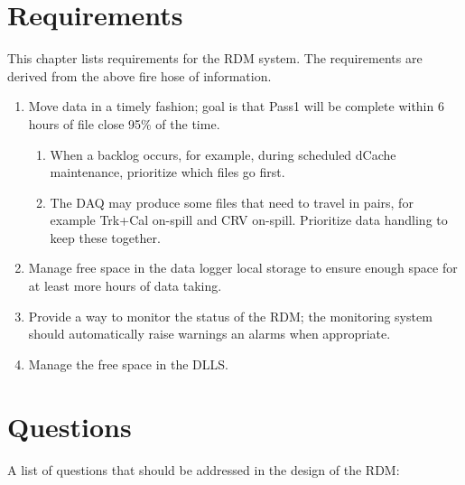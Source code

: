 
\chapter{Requirements}

This chapter lists requirements for the RDM system.
The requirements are derived from the above fire hose of information.

\begin{enumerate}
  \item Move data in a timely fashion; goal is that Pass1 will be complete within 6 hours of file close 95\% of the time.
  \begin{enumerate}
    \item When a backlog occurs, for example, during scheduled dCache maintenance, prioritize which files go first.
    \item The DAQ may produce some files that need to travel in pairs, for example Trk+Cal on-spill and CRV on-spill.
          Prioritize data handling to keep these together.
  \end{enumerate}
\item Manage free space in the data logger local storage to ensure enough space for at least  more
  hours of data taking.
\item Provide a way to monitor the status of the RDM;
  the monitoring system should automatically raise warnings an alarms when appropriate.
\item Manage the free space in the DLLS.
\end{enumerate}

\chapter{Questions}

A list of questions that should be addressed in the design of the RDM:


